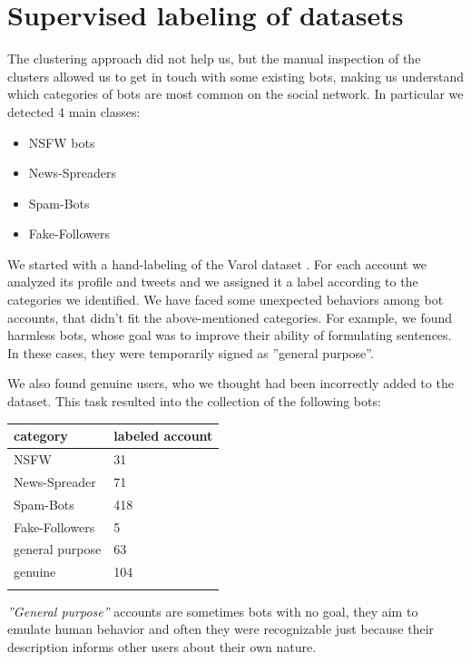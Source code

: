 \section{Supervised labeling of datasets}
\label{sec:dataset}
The clustering approach did not help us, but the manual inspection of the clusters allowed us to get in touch with some existing bots, making us understand which categories of bots are most common on the social network. In particular we detected 4 main classes:
\begin{itemize}
	\item[\PencilRight]NSFW bots
	\item[\PencilRight]News-Spreaders
	\item[\PencilRight]Spam-Bots
	\item[\PencilRight]Fake-Followers
\end{itemize}

We started with a hand-labeling of the Varol dataset \cite{Varol}. For each account we analyzed its profile and tweets and we assigned it a label according to the categories we identified.  We have faced some unexpected behaviors among bot accounts, that didn't fit the above-mentioned categories. For example, we found harmless bots, whose goal was to improve their ability of formulating sentences. In these cases, they were temporarily signed as ''general purpose''.

We also found genuine users, who we thought  had been incorrectly added to the dataset.
This task resulted into the collection of the following bots:

\begin{center}
	\begin{tabular}{ll}
		\\category&labeled account\\
		\hline\hline
		NSFW&31\\
		News-Spreader&71\\
		Spam-Bots&418\\
		Fake-Followers&5\\
		general purpose&63\\
		genuine&104\\\hline\\		
	\end{tabular}
\end{center}

\emph{''General purpose''} accounts are sometimes bots with no goal, they aim to emulate human behavior and often they were recognizable just because their description informs other users about their own nature.

